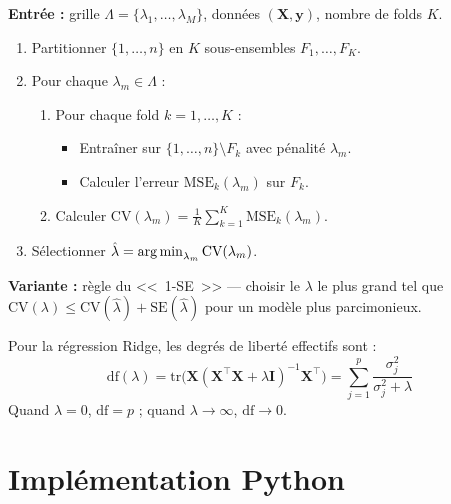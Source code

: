 \begin{algorithme}[title=\textbf{$K$-fold cross-validation pour $\lambda$}]
\textbf{Entr\'ee :} grille $\Lambda = \{\lambda_1, \ldots, \lambda_M\}$, donn\'ees
$(\bm{X}, \bm{y})$, nombre de folds $K$.

\begin{enumerate}
  \item Partitionner $\{1, \ldots, n\}$ en $K$ sous-ensembles $F_1, \ldots, F_K$.
  \item Pour chaque $\lambda_m \in \Lambda$ :
    \begin{enumerate}
      \item Pour chaque fold $k = 1, \ldots, K$ :
        \begin{itemize}
          \item Entra\^iner sur $\{1,\ldots,n\} \setminus F_k$ avec p\'enalit\'e $\lambda_m$.
          \item Calculer l'erreur $\text{MSE}_k(\lambda_m)$ sur $F_k$.
        \end{itemize}
      \item Calculer $\text{CV}(\lambda_m) = \frac{1}{K}\sum_{k=1}^{K}\text{MSE}_k(\lambda_m)$.
    \end{enumerate}
  \item S\'electionner $\hat{\lambda} = \operatorname*{arg\,min}_{\lambda_m} \text{CV}(\lambda_m)$.
\end{enumerate}

\textbf{Variante :} r\`egle du <<~1-SE~>> --- choisir le $\lambda$ le plus grand tel que
$\text{CV}(\lambda) \leq \text{CV}(\hat{\lambda}) + \text{SE}(\hat{\lambda})$ pour un
mod\`ele plus parcimonieux.
\end{algorithme}

\begin{formules}[title=\textbf{Degr\'es de libert\'e effectifs}]
Pour la r\'egression Ridge, les degr\'es de libert\'e effectifs sont :
\[
  \text{df}(\lambda) = \text{tr}\bigl(\bm{X}(\bm{X}^\top \bm{X} + \lambda \bm{I})^{-1}\bm{X}^\top\bigr)
  = \sum_{j=1}^{p} \frac{\sigma_j^2}{\sigma_j^2 + \lambda}
\]
Quand $\lambda = 0$, $\text{df} = p$ ; quand $\lambda \to \infty$, $\text{df} \to 0$.
\end{formules}

\section{Impl\'ementation Python}
\label{sec:reg-python}

